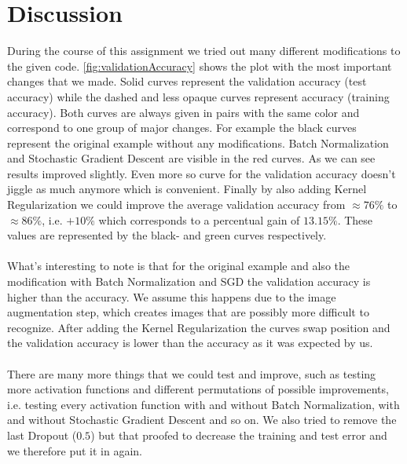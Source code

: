 \documentclass{article}
\begin{document}
	\section{Discussion}
	\label{sec:Discussion}
	During the course of this assignment we tried out many different modifications to the given code. \autoref{fig:validationAccuracy} shows the plot with the most important changes that we made. Solid curves represent the validation accuracy (test accuracy) while the dashed and less opaque curves represent accuracy (training accuracy). Both curves are always given in pairs with the same color and correspond to one group of major changes. For example the black curves represent the original example without any modifications. Batch Normalization and Stochastic Gradient Descent are visible in the red curves. As we can see results improved slightly. Even more so curve for the validation accuracy doesn't jiggle as much anymore which is convenient. Finally by also adding Kernel Regularization we could improve the average validation accuracy from $\approx76\%$ to $\approx86\%$, i.e. $+10\%$ which corresponds to a percentual gain of $13.15\%$. These values are represented by the black- and green curves respectively. \\
	\\
	What's interesting to note is that for the original example and also the modification with Batch Normalization and SGD the validation accuracy is higher than the accuracy. We assume this happens due to the image augmentation step, which creates images that are possibly more difficult to recognize. After adding the Kernel Regularization the curves swap position and the validation accuracy is lower than the accuracy as it was expected by us. \\
	\\
	There are many more things that we could test and improve, such as testing more activation functions and different permutations of possible improvements, i.e. testing every activation function with and without Batch Normalization, with and without Stochastic Gradient Descent and so on. We also tried to remove the last Dropout ($0.5$) but that proofed to decrease the training and test error and we therefore put it in again. 

	
	
\end{document}
